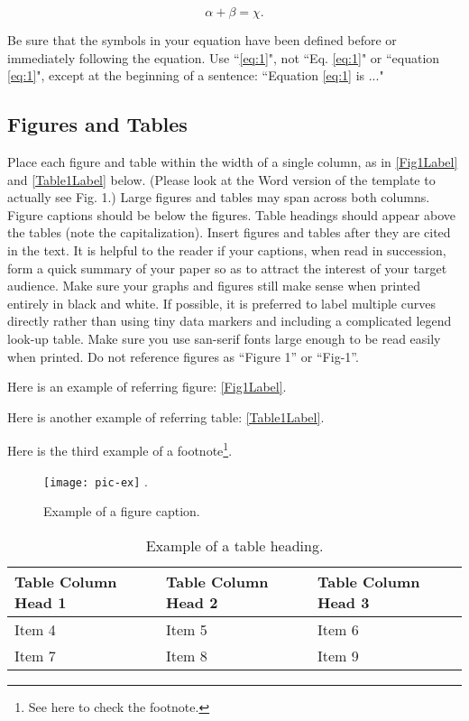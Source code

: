 \documentclass[]{NRSMRev}
\begin{document}
\begin{equation} \label{eq:1}
\alpha+\beta=\chi.
\end{equation}
	            	
Be sure that the symbols in your equation have been defined before or immediately following the equation. Use ``\eqref{eq:1}", not ``Eq. \eqref{eq:1}" or ``equation \eqref{eq:1}", except at the beginning of a sentence: ``Equation \eqref{eq:1} is ..."

\subsection{Figures and Tables}
Place each figure and table within the width of a single column, as in \autoref{Fig1Label} and \autoref{Table1Label} below. (Please look at the Word version of the template to actually see Fig. 1.) Large figures and tables may span across both columns. Figure captions should be below the figures. Table headings should appear above the tables (note the capitalization). Insert figures and tables after they are cited in the text. It is helpful to the reader if your captions, when read in succession, form a quick summary of your paper so as to attract the interest of your target audience. Make sure your graphs and figures still make sense when printed entirely in black and white. If possible, it is preferred to label multiple curves directly rather than using tiny data markers and including a complicated legend look-up table. Make sure you use san-serif fonts large enough to be read easily when printed. Do not reference figures as ``Figure 1'' or ``Fig-1''.

Here is an example of referring figure: \autoref{Fig1Label}.

Here is another example of referring table: \autoref{Table1Label}.

Here is the third example of a footnote\footnote{See here to check the footnote.}.

\begin{figure}[h]
  \centering
  \noindent
  \texttt{[image: pic-ex]}
  \DeclareGraphicsExtensions.
  \caption{Example of a figure caption.}
  \label{Fig1Label}
\end{figure}

\begin{table}[h] 
  \centering
  \caption{Example of a table heading.}
  \begin{tabular}{|m{}<{\centering}|m{}<{\centering}|m{}<{\centering}|}
    \hline
    Table Column Head 1 & Table Column Head 2 & Table Column Head 3\\
    \hline
    Item 4 & Item 5 & Item 6\\
    \hline
    Item 7 & Item 8 & Item 9\\
    \hline
  \end{tabular}
  \label{Table1Label}
\end{table}
\end{document}
